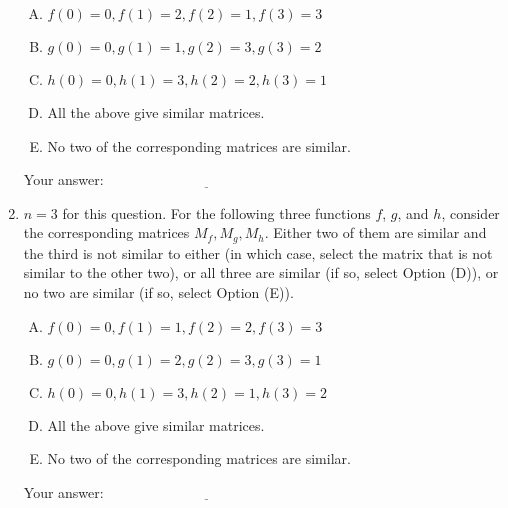 \documentclass[10pt]{amsart}
\begin{document}
\begin{enumerate}
  \begin{enumerate}[(A)]
  \item $f(0) = 0, f(1) = 2, f(2) = 1, f(3) = 3$
  \item $g(0) = 0, g(1) = 1, g(2) = 3, g(3) = 2$
  \item $h(0) = 0, h(1) = 3, h(2) = 2, h(3) = 1$
  \item All the above give similar matrices.
  \item No two of the corresponding matrices are similar.
  \end{enumerate}

  \vspace{0.1in}
  Your answer: $\underline{\qquad\qquad\qquad\qquad\qquad\qquad\qquad}$
  \vspace{0.1in}

\item $n = 3$ for this question. For the following three functions
  $f$, $g$, and $h$, consider the corresponding matrices
  $M_f,M_g,M_h$. Either two of them are similar and the third is not
  similar to either (in which case, select the matrix that is not
  similar to the other two), or all three are similar (if so, select
  Option (D)), or no two are similar (if so, select Option (E)).

  \begin{enumerate}[(A)]
  \item $f(0) = 0, f(1) = 1, f(2) = 2, f(3) = 3$
  \item $g(0) = 0, g(1) = 2, g(2) = 3, g(3) = 1$
  \item $h(0) = 0, h(1) = 3, h(2) = 1, h(3) = 2$
  \item All the above give similar matrices.
  \item No two of the corresponding matrices are similar.
  \end{enumerate}

  \vspace{0.1in}
  Your answer: $\underline{\qquad\qquad\qquad\qquad\qquad\qquad\qquad}$
  \vspace{0.1in}
\end{enumerate}
\end{document}
